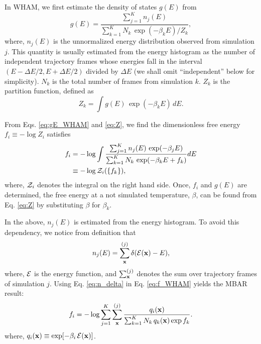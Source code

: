 \documentclass[reprint,superscriptaddress]{revtex4-1}
\begin{document}
In WHAM,
we first estimate the density of states $g(E)$ from
%
\begin{equation}
g(E)
=
\frac{
  \sum_{j = 1}^K n_j(E)
}
{
  \sum_{k = 1}^K N_k \, \exp(-\beta_k E) / Z_k
},
\label{eq:gE_WHAM}
\end{equation}
%
where,
$n_j(E)$
is the unnormalized energy distribution
observed from simulation $j$.
%
This quantity is usually estimated
from the energy histogram as
the number of independent trajectory frames
whose energies fall in the interval
$(E - \Delta E/2, E + \Delta E/2)$
divided by $\Delta E$
(we shall omit ``independent'' below for simplicity).
%
$N_k$
is the total number of frames
from simulation $k$.
%
$Z_k$
is the partition function,
defined as
%
\begin{equation}
Z_k
=
\int g(E) \, \exp(-\beta_k E) \, dE.
\label{eq:Z}
\end{equation}




From Eqs. \eqref{eq:gE_WHAM} and \eqref{eq:Z},
we find the dimensionless free energy
$f_i \equiv -\log Z_i$
satisfies
\begin{align}
f_i
&=
-\log
  \int
    \frac{
      \sum_{j = 1}^K n_j(E) \, \exp(-\beta_j E)
    }
    {
      \sum_{k = 1}^K N_k \, \exp(-\beta_k E + f_k)
    }
    dE
\label{eq:f_WHAM}
\\
&\equiv
-\log \mathcal{Z}_i(\{ f_k \}),
\notag
\end{align}
%
where,
$\mathcal{Z}_i$
denotes the integral on the right hand side.
%
Once, $f_i$ and $g(E)$ are determined,
the free energy at a not simulated temperature, $\beta$,
can be found from Eq. \eqref{eq:Z}
by substituting $\beta$ for $\beta_k$.



In the above,
$n_j(E)$ is estimated from the energy histogram.
%
To avoid this dependency,
we notice from definition that
%
\begin{equation}
n_j(E)
=
\sum_{\mathbf{x}}^{(j)} \delta(\mathcal{E}(\mathbf{x}) - E),
\label{eq:n_delta}
\end{equation}
%
where,
$\mathcal{E}$
is the energy function,
and
$\sum_{\mathbf{x}}^{(j)}$
denotes the sum over trajectory frames
of simulation $j$.
%
%
%
Using Eq. \eqref{eq:n_delta} in Eq. \eqref{eq:f_WHAM} yields
the MBAR\cite{shirts2008} result:
%
\begin{equation}
f_i
=
-\log
\sum_{j = 1}^K
\sum_{\mathbf{x}}^{(j)}
\frac{
  q_i(\mathbf{x})
}
{
  \sum_{k = 1}^K N_k \, q_k(\mathbf{x}) \exp f_k
}.
\label{eq:f_MBAR}
\end{equation}
%
where,
$q_i(\mathbf{x}) \equiv \exp[ -\beta_i \, \mathcal{E}(\mathbf{x}) ]$.
\end{document}

